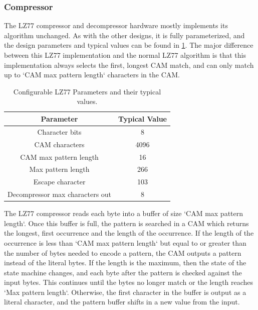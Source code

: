 \documentclass[doublespace,nopageskip]{VTthesis}
\begin{document}
\subsubsection{Compressor}\label{sss:lz77_compressor_design}
The LZ77 compressor and decompressor hardware mostly implements its algorithm unchanged. As with the other designs, it is fully parameterized, and the design parameters and typical values can be found in \ref{tab:lz77-configuration-table}. The major difference between this LZ77 implementation and the normal LZ77 algorithm is that this implementation always selects the first, longest CAM match, and can only match up to `CAM max pattern length` characters in the CAM.

\begin{table}[htb]
	\centering
	\caption{Configurable LZ77 Parameters and their typical values.}
	\begin{tabular}{cc}
	    \toprule
	    Parameter & Typical Value \\
	    \midrule
	    Character bits & 8 \\
	    \midrule
	    CAM characters & 4096 \\
	    \midrule
	    CAM max pattern length & 16 \\
	    \midrule
	    Max pattern length & 266 \\ 
	    \midrule
	    Escape character & 103 \\ 
	    \midrule
	    Decompressor max characters out & 8\\
	    \bottomrule
	\end{tabular}
	\label{tab:lz77-configuration-table}
\end{table}

The LZ77 compressor reads each byte into a buffer of size `CAM max pattern length`. Once this buffer is full, the pattern is searched in a CAM which returns the longest, first occurrence and the length of the occurrence. If the length of the occurrence is less than `CAM max pattern length` but equal to or greater than the number of bytes needed to encode a pattern, the CAM outputs a pattern instead of the literal bytes. If the length is the maximum, then the state of the state machine changes, and each byte after the pattern is checked against the input bytes. This continues until the bytes no longer match or the length reaches `Max pattern length`. Otherwise, the first character in the buffer is output as a literal character, and the pattern buffer shifts in a new value from the input.
\end{document}
